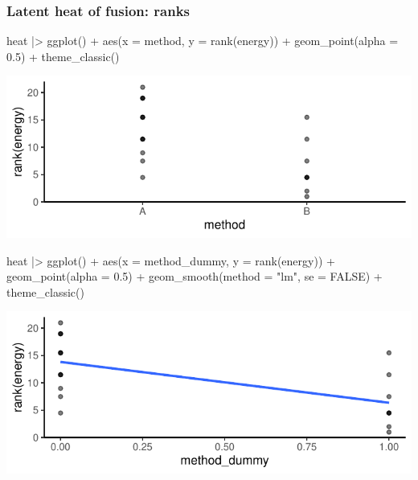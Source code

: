 \documentclass[a4paper]{article}\usepackage[]{graphicx}\usepackage[]{xcolor}
\makeatletter
\def\maxwidth{ %
  \ifdim\Gin@nat@width>\linewidth
    \linewidth
  \else
    \Gin@nat@width
  \fi
}
\makeatother
\begin{document}
\subsubsection{Latent heat of fusion: ranks}
\begin{Schunk}
\begin{Sinput}
heat |> ggplot() +
  aes(x = method, y = rank(energy)) + 
  geom_point(alpha = 0.5) +
  theme_classic()
\end{Sinput}


{\centering \includegraphics[width=\maxwidth]{figure/listings-unnamed-chunk-195-1} 

}

\begin{Sinput}
heat |> ggplot() +
  aes(x = method_dummy, 
      y = rank(energy)) + 
  geom_point(alpha = 0.5) + 
  geom_smooth(method = "lm",
              se = FALSE) +
  theme_classic()
\end{Sinput}


{\centering \includegraphics[width=\maxwidth]{figure/listings-unnamed-chunk-195-2} 

}

\end{Schunk}
\end{document}
